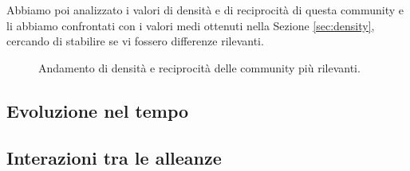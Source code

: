 Abbiamo poi analizzato i valori di densità e di reciprocità di questa community e li abbiamo confrontati con i valori medi ottenuti nella Sezione \ref{sec:density}, cercando di stabilire se vi fossero differenze rilevanti.
\begin{figure}
	\hfill
	\caption{Andamento di densità e reciprocità delle community più rilevanti.}
	\label{fig:most_imp_dens}
\end{figure}

\subsection{Evoluzione nel tempo}

\subsection{Interazioni tra le alleanze}
